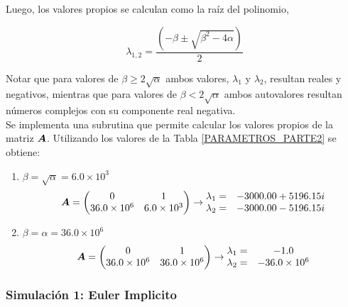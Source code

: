 Luego, los valores propios se calculan como la raíz del polinomio,

\begin{equation}
\lambda_{1,2} = \dfrac{( -\beta \pm \sqrt{ \beta^2 - 4 \alpha})}{2}
\end{equation}

Notar que para valores de $\beta \geq 2\sqrt{\alpha}$ ambos valores, $\lambda_1$ y $\lambda_2$, resultan reales y negativos, mientras que para valores de $\beta < 2\sqrt{\alpha}$ ambos autovalores resultan números complejos con su componente real negativa. \\

Se implementa una subrutina que permite calcular los valores propios de la matriz $\boldsymbol{A}$. Utilizando los valores de la Tabla \ref{PARAMETROS_PARTE2} se obtiene:
\begin{enumerate} [label=(\alph*)]
\item $\beta = \sqrt{\alpha} = 6.0 \times 10^3 $
\begin{equation}
\boldsymbol{A} = \begin{pmatrix} 0 & 1 \\ 36.0 \times 10^6 & 6.0 \times 10^3 \end{pmatrix} \rightarrow 
\begin{matrix} \lambda_1 = & -3000.00 + 5196.15 i \\ \lambda_2 = & -3000.00 - 5196.15 i \end{matrix}
\end{equation} 
\item $\beta = \alpha =  36.0 \times 10^6 $
\begin{equation}
\boldsymbol{A} = \begin{pmatrix} 0 & 1 \\ 36.0 \times 10^6 & 36.0 \times 10^6 \end{pmatrix} \rightarrow 
\begin{matrix} \lambda_1 = & -1.0 \\ \lambda_2 = & -36.0 \times 10^6 \end{matrix}
\end{equation} 
\end{enumerate}


\subsubsection{Simulación 1: Euler Implicito} 

